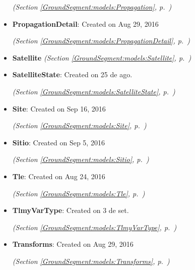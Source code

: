 \begin{itemize}
  \textit{(Section \ref{GroundSegment:models:Propagation}, p.~\pageref{GroundSegment:models:Propagation})}

\item \textbf{PropagationDetail}: 
Created on Aug 29, 2016




  \textit{(Section \ref{GroundSegment:models:PropagationDetail}, p.~\pageref{GroundSegment:models:PropagationDetail})}

\item \textbf{Satellite}
  \textit{(Section \ref{GroundSegment:models:Satellite}, p.~\pageref{GroundSegment:models:Satellite})}

\item \textbf{SatelliteState}: 
Created on 25 de ago. 


  \textit{(Section \ref{GroundSegment:models:SatelliteState}, p.~\pageref{GroundSegment:models:SatelliteState})}

\item \textbf{Site}: 
Created on Sep 16, 2016




  \textit{(Section \ref{GroundSegment:models:Site}, p.~\pageref{GroundSegment:models:Site})}

\item \textbf{Sitio}: 
Created on Sep 5, 2016




  \textit{(Section \ref{GroundSegment:models:Sitio}, p.~\pageref{GroundSegment:models:Sitio})}

\item \textbf{Tle}: 
Created on Aug 24, 2016




  \textit{(Section \ref{GroundSegment:models:Tle}, p.~\pageref{GroundSegment:models:Tle})}

\item \textbf{TlmyVarType}: 
Created on 3 de set. 


  \textit{(Section \ref{GroundSegment:models:TlmyVarType}, p.~\pageref{GroundSegment:models:TlmyVarType})}

\item \textbf{Transforms}: 
Created on Aug 29, 2016




  \textit{(Section \ref{GroundSegment:models:Transforms}, p.~\pageref{GroundSegment:models:Transforms})}

\end{itemize}

